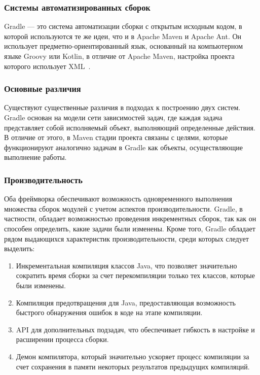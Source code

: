 \subsubsection{Системы автоматизированных сборок}

Gradle — это система автоматизации сборки с открытым исходным кодом, в которой используются те же идеи, что и в Apache Maven и Apache Ant.
Он использует предметно-ориентированный язык, основанный на компьютерном языке Groovy или Kotlin, в отличие от Apache Maven, настройка проекта которого использует XML~\cite{gradle_vs_maven}.

\subsubsection{Основные различия}

Существуют существенные различия в подходах к построению двух систем.
Gradle основан на модели сети зависимостей задач, где каждая задача представляет собой исполняемый объект, выполняющий определенные действия.
В отличие от этого, в Maven стадии проекта связаны с целями, которые функционируют аналогично задачам в Gradle как объекты, осуществляющие выполнение работы.

\subsubsection{Производительность}

Оба фреймворка обеспечивают возможность одновременного выполнения множества сборок модулей с учетом аспектов производительности.
Gradle, в частности, обладает возможностью проведения инкрементных сборок, так как он способен определить, какие задачи были изменены.
Кроме того, Gradle обладает рядом выдающихся характеристик производительности, среди которых следует выделить:

\begin{enumerate}
    \item Инкрементальная компиляция классов Java, что позволяет значительно сократить время сборки за счет перекомпиляции только тех классов, которые были изменены.
    \item Компиляция предотвращения для Java, предоставляющая возможность быстрого обнаружения ошибок в коде на этапе компиляции.
    \item API для дополнительных подзадач, что обеспечивает гибкость в настройке и расширении процесса сборки.
    \item Демон компилятора, который значительно ускоряет процесс компиляции за счет сохранения в памяти некоторых результатов предыдущих компиляций.
\end{enumerate}

